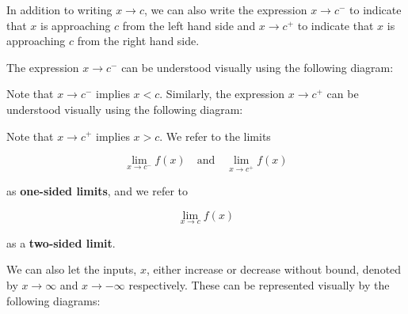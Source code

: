 \documentclass[handout]{ximera}
\begin{document}
In addition to writing $x \to c$, we can also write the expression
$x \to c^-$ to indicate that $x$ is approaching $c$ from the left hand side and $x \to c^+$ to 
indicate that $x$ is approaching $c$ from the right hand side.

The expression $x \to c^-$ can be understood visually using the following diagram:




\begin{center}

\end{center}

Note that $x \to c^-$ implies $x < c$.
Similarly, the expression $x \to c^+$ can be understood visually using the following diagram:



\begin{center}
\end{center}

Note that $x \to c^+$ implies $x > c$. We refer to the limits

\[\lim_{x \to c^-} f(x)  \quad \text{and} \quad \lim_{x \to c^+} f(x) \]

as \textbf{one-sided limits}, and we refer to 

\[\lim_{x \to c} f(x) \]

as a \textbf{two-sided limit}.


We can also let the inputs, $x$, either increase or decrease without bound, denoted by $x \to \infty$ and $x \to -\infty$ respectively.
These can be represented visually by the following diagrams:
\end{document}
